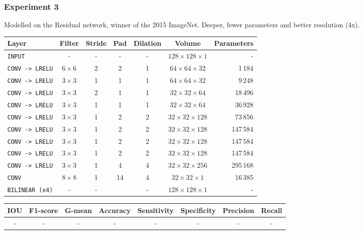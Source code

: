 \documentclass{beamer}
\begin{document}
	\begin{frame}
		\frametitle{Experiment 3}
		Modelled on the Residual network, winner of the 2015 ImageNet. Deeper, fewer parameters and better resolution (4x).
		\footnotesize
		\begin{table}[h]
			\centering
			\begin{tabular}{lcccccr}
			\hline
			\textbf{Layer} & \textbf{Filter} & \textbf{Stride} & \textbf{Pad} & \textbf{Dilation} & \textbf{Volume} & \textbf{Parameters} \\
			\hline
			\texttt{INPUT}	&- & -	& - & - & $128 \times 128 \times 1$ & -\\
			\texttt{CONV -> LRELU}	& $6 \times 6$ & 2 & 2 & 1 & $64 \times 64 \times 32$ & 1\,184\\
			\texttt{CONV -> LRELU}	& $3 \times 3$ & 1 & 1 & 1 & $64 \times 64 \times 32$ & 9\,248\\
			\texttt{CONV -> LRELU}	& $3 \times 3$ & 2 & 1 & 1 & $32 \times 32 \times 64$ & 18\,496\\
			\texttt{CONV -> LRELU}	& $3 \times 3$ & 1 & 1 & 1 & $32 \times 32 \times 64$ & 36\,928\\
			\texttt{CONV -> LRELU}	& $3 \times 3$ & 1 & 2 & 2 & $32 \times 32 \times 128$ & 73\,856\\
			\texttt{CONV -> LRELU}	& $3 \times 3$ & 1 & 2 & 2 & $32 \times 32 \times 128$ & 147\,584\\
			\texttt{CONV -> LRELU}	& $3 \times 3$ & 1 & 2 & 2 & $32 \times 32 \times 128$ & 147\,584\\
			\texttt{CONV -> LRELU}	& $3 \times 3$ & 1 & 2 & 2 & $32 \times 32 \times 128$ & 147\,584\\
			\texttt{CONV -> LRELU}	& $3 \times 3$ & 1 & 4 & 4 & $32 \times 32 \times 256$ & 295\,168\\
			\texttt{CONV}	& $8 \times 8$ & 1 & 14 & 4 & $32 \times 32 \times 1$ & 16\,385\\
			\texttt{BILINEAR (x4)}		& - & - && - & $128 \times 128 \times 1$ & -\\
			\hline
			\end{tabular}
		\end{table}
		
		\scriptsize
		\begin{table}[h]
			\centering
			\begin{tabular}{cccccccc}
			\hline
			\textbf{IOU}	& \textbf{F1-score}	& \textbf{G-mean} &\textbf{Accuracy}	& \textbf{Sensitivity} & \textbf{Specificity} & \textbf{Precision} & \textbf{Recall}\\
			\hline
			- & - & - & - & - & - & - & -\\
			\hline
			\end{tabular}
		\end{table}
	\end{frame}
\end{document}
